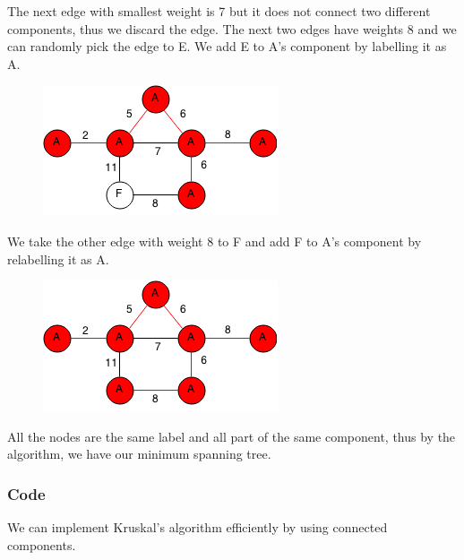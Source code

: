 \documentclass[11pt,oneside]{book}
\makeatletter
\def\maxwidth#1{\ifdim\Gin@nat@width>#1 #1\else\Gin@nat@width\fi}
\makeatother
\begin{document}
The next edge with smallest weight is 7 but it does not connect two different components, thus we discard the edge. The next two edges have weights 8 and we can randomly pick the edge to E. We add E to A's component by labelling it as A.

\vspace{5px}\begin{figure}[H]\centering
        \includegraphics[width=0.66\maxwidth{\textwidth}]{kruskal6.png}
        \end{figure}

We take the other edge with weight 8 to F and add F to A's component by relabelling it as A.

\vspace{5px}\begin{figure}[H]\centering
        \includegraphics[width=0.66\maxwidth{\textwidth}]{kruskal7.png}
        \end{figure}

All the nodes are the same label and all part of the same component, thus by the algorithm, we have our minimum spanning tree.

\subsubsection{Code}

We can implement Kruskal's algorithm efficiently by using connected components.
\end{document}
